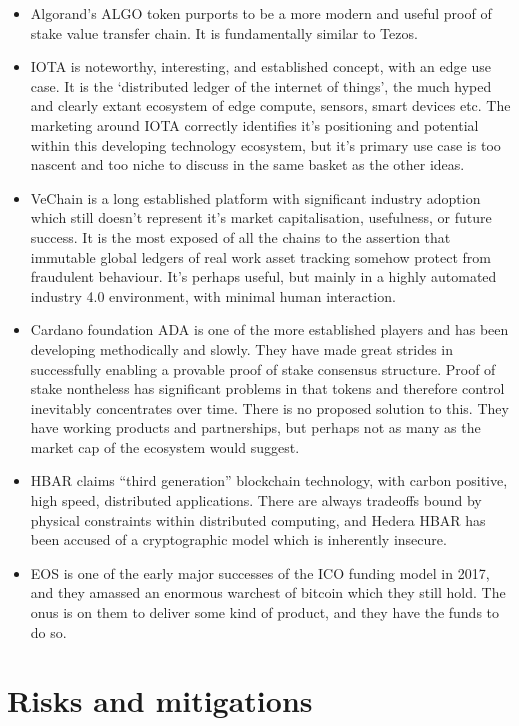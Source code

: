 \begin{itemize}
\item Algorand's ALGO token purports to be a more modern and useful proof of stake value transfer chain. It is fundamentally similar to Tezos.
\item IOTA is noteworthy, interesting, and established concept, with an edge use case. It is the `distributed ledger of the internet of things', the much hyped and clearly extant ecosystem of edge compute, sensors, smart devices etc. The marketing around IOTA correctly identifies it's positioning and potential within this developing technology ecosystem, but it's primary use case is too nascent and too niche to discuss in the same basket as the other ideas.
\item VeChain is a long established platform with significant industry adoption which still doesn't represent it's market capitalisation, usefulness, or future success. It is the most exposed of all the chains to the assertion that immutable global ledgers of real work asset tracking somehow protect from fraudulent behaviour. It's perhaps useful, but mainly in a highly automated industry 4.0 environment, with minimal human interaction.
\item Cardano foundation ADA is one of the more established players and has been developing methodically and slowly. They have made great strides in successfully enabling a provable proof of stake consensus structure. Proof of stake nontheless has significant problems in that tokens and therefore control inevitably concentrates over time. There is no proposed solution to this. They have working products and partnerships, but perhaps not as many as the market cap of the ecosystem would suggest. 
\item HBAR claims ``third generation'' blockchain technology, with carbon positive, high speed, distributed applications. There are always tradeoffs bound by physical constraints within distributed computing, and Hedera HBAR has been accused of a cryptographic model which is inherently insecure.
\item EOS is one of the early major successes of the ICO funding model in 2017, and they amassed an enormous warchest of bitcoin which they still hold. The onus is on them to deliver some kind of product, and they have the funds to do so.
\end{itemize}
\section{Risks and mitigations}
